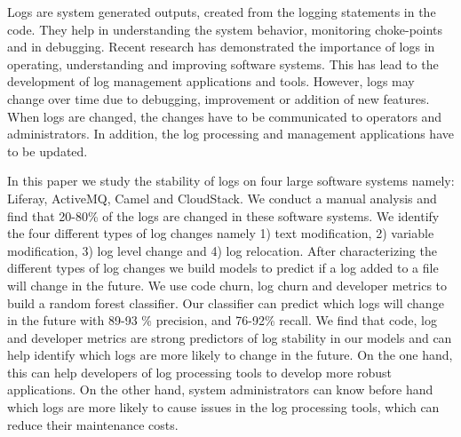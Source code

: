 Logs are system generated outputs, created from the logging statements in the code. They help in understanding the system behavior, monitoring choke-points and in debugging. Recent research has demonstrated the importance of logs in operating, understanding and improving software systems. This has lead to the development of log management applications and tools. However, logs may change over time due to debugging, improvement or addition of new features. When logs are changed, the changes have to be communicated to operators and administrators. In addition, the log processing and management applications have to be updated. 

In this paper we study the stability of logs on four large software systems namely: Liferay, ActiveMQ, Camel and CloudStack. We conduct a manual analysis and find that 20-80\% of the logs are changed in these software systems. We identify the four different types of log changes namely 1) text modification, 2) variable modification, 3) log level change and 4) log relocation. After characterizing the different types of log changes we build models to predict if a log added to a file will change in the future. We use code churn, log churn and developer metrics to build a random forest classifier. Our classifier can predict which logs will change in the future with 89-93 \% precision, and 76-92\% recall.  We find that code, log and developer metrics are strong predictors of log stability in our models and can help identify which logs are more likely to change in the future. On the one hand, this can help developers of log processing tools to develop more robust applications. On the other hand, system administrators can know before hand which logs are more likely to cause issues in the log processing tools, which can reduce their maintenance costs.
